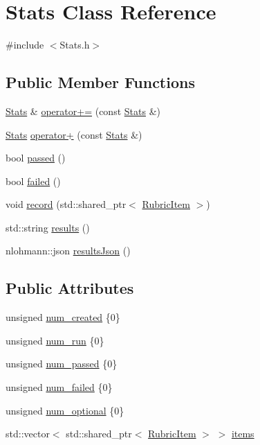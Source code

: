 \hypertarget{class_stats}{}\section{Stats Class Reference}
\label{class_stats}


{\ttfamily \#include $<$Stats.\+h$>$}

\subsection*{Public Member Functions}
\begin{DoxyCompactItemize}
\item 
\hyperlink{class_stats}{Stats} \& \hyperlink{class_stats_a40fa54dfb9b36d73bd77c5db4b294a79}{operator+=} (const \hyperlink{class_stats}{Stats} \&)
\item 
\hyperlink{class_stats}{Stats} \hyperlink{class_stats_a32ab6b479ad79fe923e2264e09080806}{operator+} (const \hyperlink{class_stats}{Stats} \&)
\item 
bool \hyperlink{class_stats_aeadd76aff06c7e684370251d2e75abf3}{passed} ()
\item 
bool \hyperlink{class_stats_afa92b4d8fa48ee7cd6e349ae6a5bf539}{failed} ()
\item 
void \hyperlink{class_stats_ad80ca89a4ce1578b41d0b64b873457af}{record} (std\+::shared\+\_\+ptr$<$ \hyperlink{class_rubric_item}{Rubric\+Item} $>$)
\item 
std\+::string \hyperlink{class_stats_a0c05e0e2304a9ac271fc0e95493c9aeb}{results} ()
\item 
nlohmann\+::json \hyperlink{class_stats_a6d0361dcb25186d1d168009a66cb675d}{results\+Json} ()
\end{DoxyCompactItemize}
\subsection*{Public Attributes}
\begin{DoxyCompactItemize}
\item 
unsigned \hyperlink{class_stats_aae6907517029159a56582d4050d37ba9}{num\+\_\+created} \{0\}
\item 
unsigned \hyperlink{class_stats_aad4b62381ae2f53d8449ed2adda1f112}{num\+\_\+run} \{0\}
\item 
unsigned \hyperlink{class_stats_a23aed2b3b568c55072f0bbf67cb98766}{num\+\_\+passed} \{0\}
\item 
unsigned \hyperlink{class_stats_a157cacc8bc1d42348107d4beb98bb0bf}{num\+\_\+failed} \{0\}
\item 
unsigned \hyperlink{class_stats_acc4c8dfff62e73a45c3002f7083f9d3d}{num\+\_\+optional} \{0\}
\item 
std\+::vector$<$ std\+::shared\+\_\+ptr$<$ \hyperlink{class_rubric_item}{Rubric\+Item} $>$ $>$ \hyperlink{class_stats_a07121ba8a0b750122d182cbb782b9658}{items}
\end{DoxyCompactItemize}


